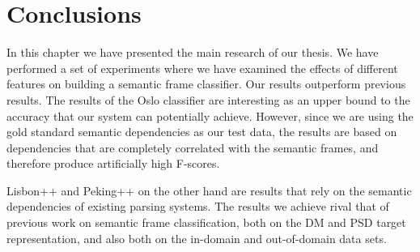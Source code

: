 \section{Conclusions}

In this chapter we have presented the main research of our thesis. We have performed a set of experiments where we have examined the effects of different features on building a semantic frame classifier. Our results outperform previous results. The results of the Oslo classifier are interesting as an upper bound to the accuracy that our system can potentially achieve. However, since we are using the gold standard semantic dependencies as our test data, the results are based on dependencies that are completely correlated with the semantic frames, and therefore produce artificially high F-scores. 

Lisbon++ and Peking++ on the other hand are results that rely on the semantic dependencies of existing parsing systems. The results we achieve  rival that of previous work on semantic frame classification, both on the DM and PSD target representation, and also both on the in-domain and out-of-domain data sets. 
